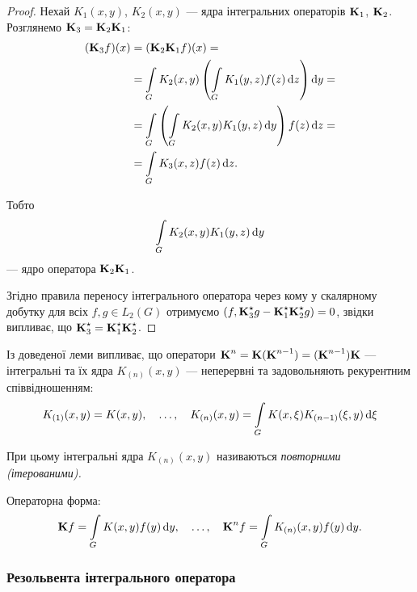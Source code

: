 \begin{proof}
	Нехай $K_1(x, y)$, $K_2(x, y)$ --- ядра інтегральних операторів $\bf{K}_1$, $\bf{K}_2$. Розглянемо $\bf{K}_3 = \bf{K}_2 \bf{K}_1$:
	\begin{equation}
		\begin{aligned}
			(\bf{K}_3 f)(x) &= (\bf{K}_2\bf{K}_1f)(x) = \\
			&= \Int_G K_2(x, y) \left( \Int_G K_1(y, z) f(z) \diff z \right) \diff y = \\
			&= \Int_G \left( \Int_G K_2(x, y) K_1(y, z) \diff y\right) f(z) \diff z = \\
			&= \Int_G K_3(x, z) f(z) \diff z.
		\end{aligned}
	\end{equation}
	
	Тобто
	\begin{equation}
		\Int_G K_2(x, y) K_1(y, z) \diff y
	\end{equation}
	--- ядро оператора $\bf{K}_2\bf{K}_1$. \medskip

	Згідно правила переносу інтегрального оператора через кому у скалярному добутку для всіх $f, g \in L_2(G)$ отримуємо $(f, \bf{K}_3^\star g - \bf{K}_1^\star  \bf{K}_2^\star  g) = 0$, звідки випливає, що $\bf{K}_3^\star  = \bf{K}_1^\star  \bf{K}_2^\star $.
\end{proof}

Із доведеної леми випливає, що оператори $\bf{K}^n = \bf{K} (\bf{K}^{n - 1}) = (\bf{K}^{n - 1})\bf{K}$ --- інтегральні та їх ядра $K_{(n)}(x, y)$ --- неперервні та задовольняють рекурентним співвідношенням:
\begin{equation}
	K_{(1)}(x, y) = K(x, y), \quad \ldots, \quad K_{(n)}(x, y) = \Int_G K(x, \xi) K_{(n - 1)}(\xi, y) \diff \xi
\end{equation}

\begin{definition}
	При цьому інтегра\-льні ядра $K_{(n)}(x, y)$ називаються \it{повторними (ітерованими)}.
\end{definition}

\begin{remark}
    Операторна форма:
    \begin{equation}
        \bf{K}f = \Int_G K(x, y) f(y) \diff y, \quad \ldots, \quad \bf{K}^n f = \Int_G K_{(n)}(x, y)f(y) \diff y.
    \end{equation}
\end{remark}

\subsubsection{Резольвента інтегрального оператора}

